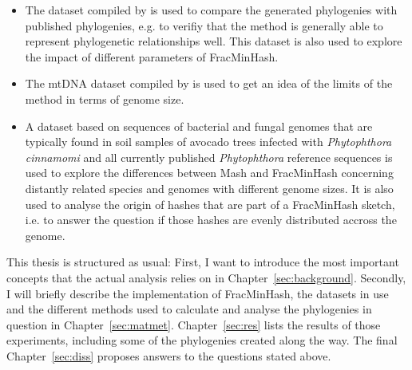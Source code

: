 \begin{itemize}
  \item The dataset compiled by 
  is used to compare the generated phylogenies with published phylogenies, e.g.
  \cite{mandalComparativeGenomeAnalysis2022,yangExpandedPhylogenyGenus2017,abadPhytophthoraTaxonomicPhylogenetic2023a}
  to verifiy that the method is generally able to represent phylogenetic
  relationships well. This dataset is also used to explore the impact of
  different parameters of FracMinHash.
  \item The mtDNA dataset compiled by
   is used to get an idea
  of the limits of the method in terms of genome size.
  \item A dataset based on sequences of bacterial and fungal genomes that are
  typically found in soil samples of avocado trees infected with
  \textit{Phytophthora cinnamomi} \cite{solis-garciaPhytophthoraRootRot2020} and
  all currently published \textit{Phytophthora} reference sequences is used to
  explore the differences between Mash and FracMinHash concerning distantly
  related species and genomes with different genome sizes. It is also used to
  analyse the origin of hashes that are part of a FracMinHash sketch, i.e. to
  answer the question if those hashes are evenly distributed accross the
  genome.
\end{itemize}

This thesis is structured as usual: First, I want to introduce the most
important concepts that the actual analysis relies on in
Chapter~\ref{sec:background}. Secondly, I will briefly describe the
implementation of FracMinHash, the datasets in use and the different methods
used to calculate and analyse the phylogenies in question in
Chapter~\ref{sec:matmet}. Chapter~\ref{sec:res} lists the results of those
experiments, including some of the phylogenies created along the way. The final
Chapter~\ref{sec:diss} proposes answers to the questions stated above. 